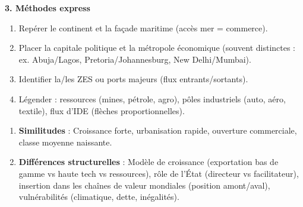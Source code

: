 \documentclass[11pt]{article}
\begin{document}
\begin{bilan}
\textbf{3. Méthodes express}
\begin{methode}
\begin{enumerate}
    \item Repérer le continent et la façade maritime (accès mer = commerce).
    \item Placer la capitale politique et la métropole économique (souvent distinctes : ex. Abuja/Lagos, Pretoria/Johannesburg, New Delhi/Mumbai).
    \item Identifier la/les ZES ou ports majeurs (flux entrants/sortants).
    \item Légender : ressources (mines, pétrole, agro), pôles industriels (auto, aéro, textile), flux d'IDE (flèches proportionnelles).
\end{enumerate}
\end{methode}

\begin{methode}
\begin{enumerate}
    \item \textbf{Similitudes} : Croissance forte, urbanisation rapide, ouverture commerciale, classe moyenne naissante.
    \item \textbf{Différences structurelles} : Modèle de croissance (exportation bas de gamme vs haute tech vs ressources), rôle de l'État (directeur vs facilitateur), insertion dans les chaînes de valeur mondiales (position amont/aval), vulnérabilités (climatique, dette, inégalités).
\end{enumerate}
\end{methode}

\end{bilan}
\end{document}
